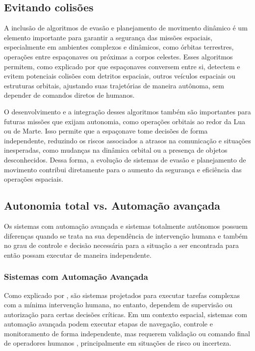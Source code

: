 \subsection{Evitando colisões}

A inclusão de algoritmos de evasão e planejamento de movimento dinâmico é um elemento importante para garantir a segurança das missões espaciais, especialmente em ambientes complexos e dinâmicos, como órbitas terrestres, operações entre espaçonaves ou próximas a corpos celestes. Esses algoritmos permitem, como explicado por \citep{newman2024} que espaçonaves conversem entre si, detectem e evitem potenciais colisões com detritos espaciais, outros veículos espaciais ou estruturas orbitais, ajustando suas trajetórias de maneira autônoma, sem depender de comandos diretos de humanos.

O desenvolvimento e a integração desses algoritmos também são importantes para futuras missões que exijam autonomia, como operações orbitais ao redor da Lua ou de Marte. Isso permite que a espaçonave tome decisões de forma independente, reduzindo os riscos associados a atrasos na comunicação e situações inesperadas, como mudanças na dinâmica orbital ou a presença de objetos desconhecidos. Dessa forma, a evolução de sistemas de evasão e planejamento de movimento contribui diretamente para o aumento da segurança e eficiência das operações espaciais.

\subsection{Autonomia total vs. Automação avançada}

Os sistemas com automação avançada e sistemas totalmente autônomos possuem diferenças quando se trata na sua dependência de intervenção humana e também no grau de controle e decisão necessária para a situação a ser encontrada para então possam executar de maneira independente.

\subsubsection{Sistemas com Automação Avançada}

Como explicado por \citep{ibmAutomation}, são sistemas projetados para executar tarefas complexas com a mínima intervenção humana, no entanto, dependem de supervisão ou autorização para certas decisões críticas. Em um contexto espacial, sistemas com automação avançada podem executar etapas de navegação, controle e monitoramento de forma independente, mas requerem validação ou comando final de operadores humanos \citep{nasaNAC2018}, principalmente em situações de risco ou incerteza.

